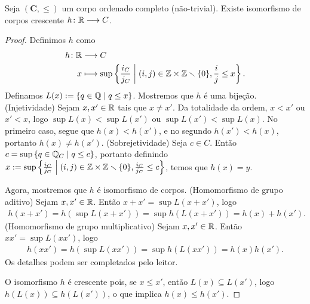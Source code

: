 \begin{proposition}
Seja $(\bm C,\leq)$ um corpo ordenado completo (não-trivial). Exis\-te isomorfismo de corpos crescente  ${h}\colon {\mathbb{R}} \longrightarrow {C}$.
\end{proposition}
\begin{proof}
Definimos $h$ como
	\begin{align*}
	{h}\colon {\mathbb{R}} &\longrightarrow {C} \\{x} &\longmapsto \sup \left\{{\frac{i_C}{j_C}}\;\middle\vert\;{(i,j) \in \mathbb{Z} \times \mathbb{Z} \smallsetminus \{0\}, \frac{i}{j} \leq x}\right\}.
	\end{align*}
Definamos $L(x) := \left\{{q \in \mathbb{Q}}\;\middle\vert\;{q \leq x}\right\}$. Mostremos que $h$ é uma bijeção. (Injetividade) Sejam $x,x' \in \mathbb{R}$ tais que $x \neq x'$. Da totalidade da ordem, $x < x'$ ou $x' < x$, logo $\sup L(x) < \sup L(x')$ ou $\sup L(x') < \sup L(x)$. No primeiro caso, segue que $h(x) < h(x')$, e no segundo $h(x') < h(x)$, portanto $h(x) \neq h(x')$. (Sobrejetividade) Seja $c \in C$. Então $c = \sup \left\{{q \in \mathbb{Q}_C}\;\middle\vert\;{q \leq c}\right\}$, portanto definindo $x := \sup \left\{{\frac{i_C}{j_C}}\;\middle\vert\;{(i,j) \in \mathbb{Z} \times \mathbb{Z} \smallsetminus \{0\}, \frac{i_C}{j_C} \leq c}\right\}$, temos que $h(x)=y$.

Agora, mostremos que $h$ é isomorfismo de corpos. (Homomorfismo de grupo aditivo) Sejam $x,x' \in \mathbb{R}$. Então $x+x' = \sup L(x+x')$, logo
	\begin{align*}
	h(x+x') = h(\sup L(x+x')) = \sup h(L(x+x')) = h(x) + h(x').
	\end{align*}
(Homomorfismo de grupo multiplicativo) Sejam $x,x' \in \mathbb{R}$. Então $xx' = \sup L(xx')$, logo
	\begin{align*}
	h(xx') = h(\sup L(xx')) = \sup h(L(xx')) = h(x)h(x').
	\end{align*}
Os detalhes podem ser completados pelo leitor.

O isomorfismo $h$ é crescente pois, se $x \leq x'$, então $L(x) \subseteq L(x')$, logo $h(L(x)) \subseteq h(L(x'))$, o que implica $h(x) \leq h(x')$.
\end{proof}

